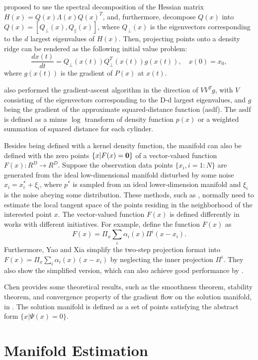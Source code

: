 \documentclass[aos,preprint]{imsart}
\theoremstyle{remark}
\begin{document}
\cite{myhre2016manifold} proposed to use the spectral decomposition of the Hessian matrix $H(x) = Q(x)\Lambda(x)Q(x)^T$, and, furthermore, decompose $Q(x)$ into $Q(x)=[Q_\perp(x), Q_{\|}(x)]$, where $Q_\perp(x)$ is the eigenvectors corresponding to the $d$ largest eigenvalues of $H(x)$. Then, projecting points onto a density ridge can be rendered as the following initial value problem:
\[
\frac{d x(t)}{dt} = Q_{\perp}(x(t)) Q^T_{\perp}(x(t)) g(x(t)), \quad x(0) = x_0,
\]
where $g(x(t))$ is the gradient of $P(x)$ at $x(t)$.

\cite{mohammed2017manifold} also performed the gradient-ascent algorithm in the direction of $VV^Tg$, with $V$ consisting of the eigenvectors corresponding to the D-d largest eigenvalues, and $g$ being the gradient of the approximate squared-distance function (asdf). The asdf is defined as a minus $\log$ transform of density function $p(x)$ or a weighted summation of squared distance for each cylinder.

Besides being defined with a kernel density function, the manifold can also be defined with the zero points $\{x| F(x)={\bf 0}\}$ of a vector-valued function $F(x): R^D \rightarrow R^D$.  Suppose the observation data points $\{x_i, i=1:N\}$ are generated from the ideal low-dimensional manifold disturbed by some noise $x_i = x^*_i + \xi_i$, where $p^*$ is sampled from an ideal lower-dimension manifold and $\xi_i$ is the noise abeying some distribution. These methods, such as \cite{fefferman2018fitting, mohammed2017manifold, yao2019manifold}, normally need to estimate the local tangent space of the points residing in the neighborhood of the interested point $x$. The vector-valued function $F(x)$ is defined differently in works with different initiatives. For example,  \cite{fefferman2018fitting} define the function $F(x)$ as
\[
F(x)= \Pi_x \sum_i \alpha_i(x) \Pi^i(x - x_i).
\]
Furthermore, Yao and Xia simplify the two-step projection format into $F(x)= \Pi_x \sum_i \alpha_i(x) (x - x_i)$ by neglecting the inner projection $\Pi^i$. They also show the simplified version, which can also achieve good performance by \cite{yao2019manifold}.

Chen provides some theoretical results, such as the smoothness theorem, stability theorem, and convergence property of the gradient flow on the solution manifold, in \cite{chen2020solution}. The solution manifold is defined as a set of points satisfying the abstract form $\{x| \Psi(x) = 0\}$.

\section{Manifold Estimation}
\end{document}
